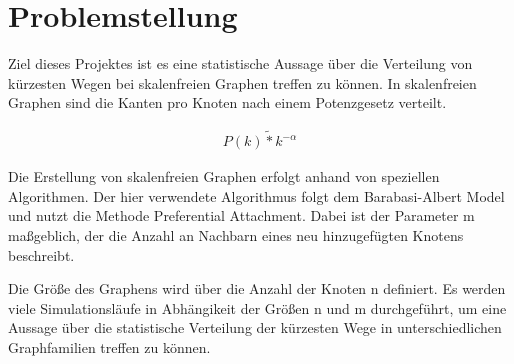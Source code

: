 \documentclass[10pt]{article}
\begin{document}
\lstset{
	language=C,
	basicstyle=\footnotesize,
	frame=tb,
	xleftmargin=.2\textwidth,
	xrightmargin=.2\textwidth
}
\onehalfspacing

\tableofcontents
\newpage
\section{Problemstellung}

Ziel dieses Projektes ist es eine statistische Aussage über die Verteilung von kürzesten Wegen bei skalenfreien Graphen treffen zu können. In skalenfreien Graphen sind die Kanten pro Knoten nach einem Potenzgesetz verteilt. 

\begin{align*}
P(k) \tilde{*} k^{-\alpha}
\end{align*}

Die Erstellung von skalenfreien Graphen erfolgt anhand von speziellen Algorithmen. Der hier verwendete Algorithmus folgt dem Barabasi-Albert Model und nutzt die Methode Preferential Attachment. Dabei ist der Parameter m maßgeblich, der die Anzahl an Nachbarn eines neu hinzugefügten Knotens beschreibt. 

Die Größe des Graphens wird über die Anzahl der Knoten n definiert. Es werden viele Simulationsläufe in Abhängikeit der Größen n und m durchgeführt, um eine Aussage über die statistische Verteilung der kürzesten Wege in unterschiedlichen Graphfamilien treffen zu können.




\end{document}
